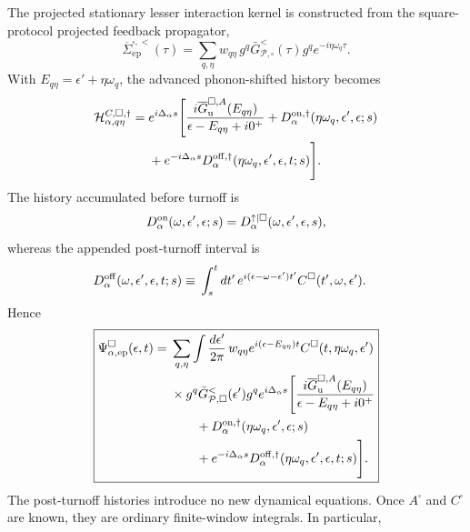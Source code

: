 \documentclass[
 reprint,
 superscriptaddress,
 amsmath,amssymb,
 aps,prb,
 longbibliography,
 floatfix
]{revtex4-2}
\newcommand{\ep}{\mathrm{ep}}
\newcommand{\barSigma}{\overline{\Sigma}}
\begin{document}
The projected stationary lesser interaction kernel is constructed from the square-protocol projected feedback propagator,
\begin{equation*}
\barSigma_{\ep}^{\square,<}(\tau)
=
\sum_{q,\eta}
w_{q\eta}\,
g^q
\bar G_{\mathcal P,\square}^{<}(\tau)
g^q
e^{-i\eta\omega_q\tau}.
\end{equation*}
With $E_{q\eta} = \epsilon'+\eta\omega_q$, the advanced phonon-shifted history becomes
\begin{align*}
\mathcal H_{\alpha,q\eta}^{C,\square,\dagger}
={}&
e^{i\Delta_\alpha s}
\Bigg[
\frac{
i\overline G_{\mathrm u}^{\square,A}(E_{q\eta})
}
{\epsilon-E_{q\eta}+i0^+}
+
D_\alpha^{\rm on,\dagger}
(\eta\omega_q,\epsilon',\epsilon;s)
\\
&+
e^{-i\Delta_\alpha s}
D_\alpha^{\rm off,\dagger}
(\eta\omega_q,\epsilon',\epsilon,t;s)
\Bigg].
\end{align*}
The history accumulated before turnoff is
\begin{equation*}
D_\alpha^{\rm on}
(\omega,\epsilon',\epsilon;s)
=
D_\alpha^{\uparrow|\square}
(\omega,\epsilon',\epsilon,s),
\end{equation*}
whereas the appended post-turnoff interval is
\begin{equation*}
\begin{aligned}
D_\alpha^{\rm off}
(\omega,\epsilon',\epsilon,t;s)
\equiv{}&
\int_s^t dt'\,
e^{i(\epsilon-\omega-\epsilon')t'}
C^\square(t',\omega,\epsilon').
\end{aligned}
\end{equation*}
Hence
\begin{equation}
\boxed{
\begin{aligned}
\Psi_{\alpha,\ep}^\square(\epsilon,t)
={}&
\sum_{q,\eta}
\int\frac{d\epsilon'}{2\pi}\,
w_{q\eta}
e^{i(\epsilon-E_{q\eta})t}
C^\square
(t,\eta\omega_q,\epsilon')
\\
&\times
g^q
\bar G_{\mathcal P,\square}^{<}(\epsilon')
g^q
e^{i\Delta_\alpha s}
\Bigg[
\frac{
i\overline G_{\mathrm u}^{\square,A}(E_{q\eta})
}
{\epsilon-E_{q\eta}+i0^+}
\\
&\qquad+
D_\alpha^{\rm on,\dagger}
(\eta\omega_q,\epsilon',\epsilon;s)
\\
&\qquad+
e^{-i\Delta_\alpha s}
D_\alpha^{\rm off,\dagger}
(\eta\omega_q,\epsilon',\epsilon,t;s)
\Bigg].
\end{aligned}}
\label{eq:Psi-square-ep-proof}
\end{equation}
The post-turnoff histories introduce no new dynamical equations. Once $A^\square$ and $C^\square$ are known, they are ordinary finite-window integrals. In particular,
\end{document}
